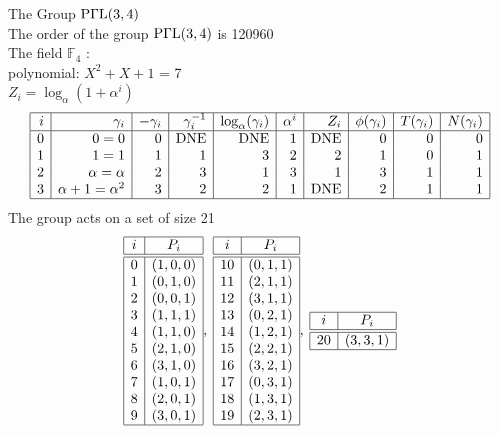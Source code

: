 

\noindent The Group ${\rm P}\Gamma {\rm L}(3,4)$\\
\noindent The order of the group ${\rm P}\Gamma {\rm L}(3,4)$ is 120960\\
\noindent The field ${\mathbb F}_{4}$ :\\
\small
polynomial: $X^{2} + X + 1$ = 7\\
$Z_i = \log_\alpha (1 + \alpha^i)$\\
$$\begin{array}{|*{10}{r|}}
\hline
i & \gamma_i & -\gamma_i& \gamma_i^{-1}& \log_\alpha(\gamma_i)& \alpha^i& Z_i& \phi(\gamma_i) & T(\gamma_i) & N(\gamma_i) \\
\hline
  0 & 0 = 0 &0 & \mbox{DNE} & \mbox{DNE} &1 & \mbox{DNE} &0 &0 &0\\
  1 &   1 = 1 &1 &1 &3 &2 &2 &1 &0 &1\\
  2 & \alpha = \alpha  &2 &3 &1 &3 &1 &3 &1 &1\\
  3 & \alpha +   1 = \alpha^{2} &3 &2 &2 &1 & \mbox{DNE} &2 &1 &1\\
\hline
\end{array}
$$
\noindent The group acts on a set of size 21\\
{\renewcommand*{\arraystretch}{1.5}
$$
\begin{array}{|c|c|}
\hline
i & P_{i}\\
\hline
\hline
0 & ( 1, 0, 0 )\\
1 & ( 0, 1, 0 )\\
2 & ( 0, 0, 1 )\\
3 & ( 1, 1, 1 )\\
4 & ( 1, 1, 0 )\\
5 & ( 2, 1, 0 )\\
6 & ( 3, 1, 0 )\\
7 & ( 1, 0, 1 )\\
8 & ( 2, 0, 1 )\\
9 & ( 3, 0, 1 )\\
\hline
\end{array}
, \;
\begin{array}{|c|c|c|}
\hline
i & P_{i}\\
\hline
\hline
10 & ( 0, 1, 1 )\\
11 & ( 2, 1, 1 )\\
12 & ( 3, 1, 1 )\\
13 & ( 0, 2, 1 )\\
14 & ( 1, 2, 1 )\\
15 & ( 2, 2, 1 )\\
16 & ( 3, 2, 1 )\\
17 & ( 0, 3, 1 )\\
18 & ( 1, 3, 1 )\\
19 & ( 2, 3, 1 )\\
\hline
\end{array}
, \;
\begin{array}{|c|c|c|}
\hline
i & P_{i}\\
\hline
\hline
20 & ( 3, 3, 1 )\\
\hline
\end{array}
$$}%
